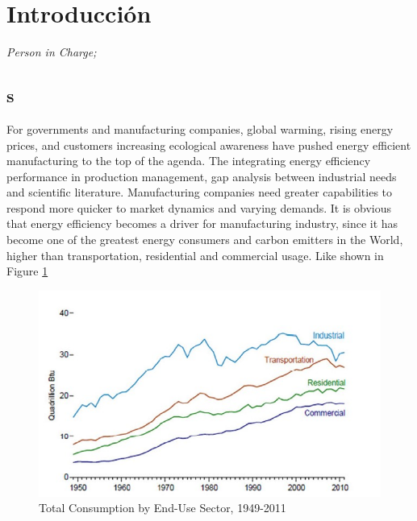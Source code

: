 





\newpage
\section{Introducci\'on}
\textit{Person in Charge; }

\subsection{s}
For governments and manufacturing companies, global warming, rising energy prices, and customers increasing ecological awareness have pushed energy efficient manufacturing to the top of the agenda. The integrating energy efficiency performance in production management, gap analysis between industrial needs and scientific literature. Manufacturing companies need greater capabilities to respond more quicker \cite{Ghani2012} to market dynamics and varying demands. It is obvious that energy efficiency becomes a driver for manufacturing industry, since it has become one of the greatest energy consumers and carbon emitters in the World, higher than transportation, residential and commercial usage. Like shown in Figure \ref{fig:TotalConsumption} 

\begin{figure}[h!]
	\centering
	\includegraphics[width=0.8\linewidth]{Figure/Total-consumption.jpg}
	\caption{Total Consumption by End-Use Sector, 1949-2011 \cite{Apostolos2013}}
	\label{fig:TotalConsumption}
\end{figure}


